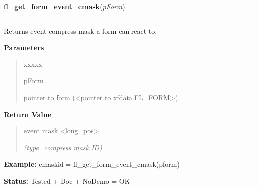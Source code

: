     \vspace{0.5ex}

\hspace{.8\funcindent}\begin{boxedminipage}{\funcwidth}

    \raggedright \textbf{fl\_get\_form\_event\_cmask}(\textit{pForm})

    \vspace{-1.5ex}

    \rule{\textwidth}{0.5\fboxrule}
\setlength{\parskip}{2ex}
    Returns event compress mask a form can react to.

\setlength{\parskip}{1ex}
      \textbf{Parameters}
      \vspace{-1ex}

      \begin{quote}
        \begin{Ventry}{xxxxx}

          \item[pForm]

          pointer to form ({\textless}pointer to 
          xfdata.FL\_FORM{\textgreater})

        \end{Ventry}

      \end{quote}

      \textbf{Return Value}
    \vspace{-1ex}

      \begin{quote}
      event mask {\textless}long\_pos{\textgreater}

      {\it (type=compress mask ID)}

      \end{quote}

\textbf{Example:} cmaskid = fl\_get\_form\_event\_cmask(pform)



\textbf{Status:} Tested + Doc + NoDemo = OK



    \end{boxedminipage}

    \label{xformslib:library:fl_set_form_geometry}

    \vspace{0.5ex}

